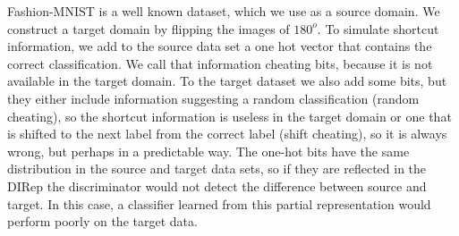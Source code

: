 \documentclass{article}
\newcommand{\elisa}[1]{\textbf{\color{red}Elisa: #1}}
\newcommand{\markw}[1]{\textbf{\color{green}Mark: #1}}
\begin{document}
Fashion-MNIST is a well known dataset, which we use as a source domain.  We construct a target domain by flipping the images of $180^o$. To simulate shortcut information, we add to the source data set a one hot vector that contains the correct classification.  We call that information cheating bits, because it is not %
available in the target domain. To the target dataset we also add some bits, but they either include information suggesting a random classification (random cheating), so the shortcut information is useless in the target domain or one that is shifted to the next label from the correct label (shift cheating), so it is always wrong, but perhaps in a predictable way. The one-hot bits have the same distribution in the source and target data sets, so if they are reflected in the DIRep the discriminator would not detect the difference between source and target. In this case, a classifier learned from this partial representation  would perform poorly on the target data.





\end{document}
